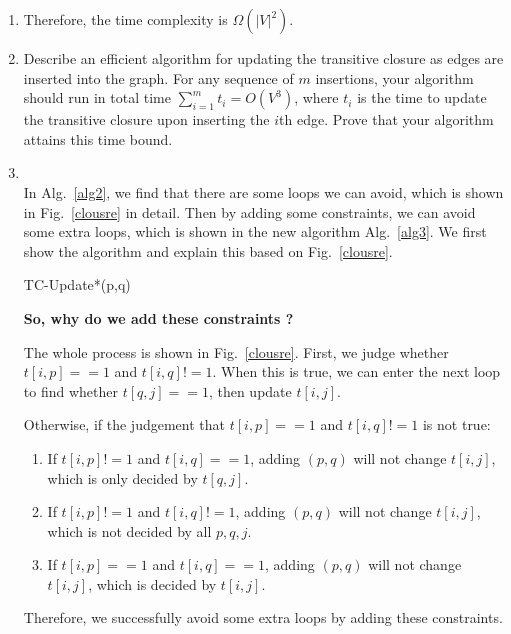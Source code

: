 \documentclass[12pt,a4paper]{article}
\makeatletter
\newtheorem*{solution}{Solution}
\theoremstyle{definition}
\renewenvironment{solution}[1][Solution] {\par\pushQED{\qed}\normalfont\topsep6\p@\@plus6\p@\relax\trivlist\item[\hskip\labelsep\bfseries#1\@addpunct{.}]\ignorespaces}{\popQED\endtrivlist\@endpefalse} \makeatother
\makeatother
\begin{document}
\begin{enumerate}
\begin{enumerate}
\begin{solution}
        Therefore, the time complexity is $\Omega (|V|^2)$.
	    \end{solution}
	    \item Describe an efficient algorithm for updating the transitive closure as edges are inserted into the graph. For any sequence of $m$ insertions, your algorithm should run in total time $\sum_{i=1}^m t_i=O(V^3)$, where $t_i$ is the time to update the transitive closure upon inserting the $i$th edge. Prove that your algorithm attains this time bound.
	    \begin{solution}
	    ~\\
	    In Alg.~\ref{alg2}, we find that there are some loops we can avoid, which is shown in Fig.~\ref{clousre} in detail. Then by adding some constraints, we can avoid some extra loops, which is shown in the new algorithm Alg.~\ref{alg3}. We first show the algorithm and explain this based on Fig.~\ref{clousre}.
	    
	    
	    
	    \begin{algorithm}[H]
	   \caption{TC-Update*(p,q)}
	   \label{alg3}
	   \end{algorithm}
	   
	   \textbf{So, why do we add these constraints ?}
	   
	   The whole process is shown in Fig.~\ref{clousre}. First, we judge whether $t[i,p]==1$ and $t[i,q]!=1$. When this is true, we can enter the next loop to find whether $t[q,j]==1$, then update $t[i,j]$. 
	   
	   Otherwise, if the judgement that $t[i,p]==1$ and $t[i,q]!=1$ is not true:
	   \begin{enumerate}
	       \item If $t[i,p]!=1$ and $t[i,q]==1$, adding $(p,q)$ will not change $t[i,j]$, which is only decided by $t[q,j]$.
	       \item If $t[i,p]!=1$ and $t[i,q]!=1$, adding $(p,q)$ will not change $t[i,j]$, which is not decided by all $p,q,j$.
	       \item If $t[i,p]==1$ and $t[i,q]==1$, adding $(p,q)$ will not change $t[i,j]$, which is decided by $t[i,j]$.
	       
	   \end{enumerate}
	   Therefore, we successfully avoid some extra loops by adding these constraints.
	   

\end{solution}
\end{enumerate}
\end{enumerate}
\end{document}
